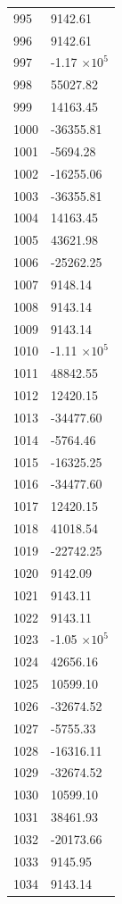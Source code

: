 \documentclass[a4paper,11pt]{article}
\begin{document}
\begin{center}
\begin{longtable}{|R{1.5cm}|R{2.6cm}|}
  995 &      9142.61 \\
  996 &      9142.61 \\
  997 &        -1.17 $\times 10^{           5}$ \\
  998 &     55027.82 \\
  999 &     14163.45 \\
 1000 &    -36355.81 \\
 1001 &     -5694.28 \\
 1002 &    -16255.06 \\
 1003 &    -36355.81 \\
 1004 &     14163.45 \\
 1005 &     43621.98 \\
 1006 &    -25262.25 \\
 1007 &      9148.14 \\
 1008 &      9143.14 \\
 1009 &      9143.14 \\
 1010 &        -1.11 $\times 10^{           5}$ \\
 1011 &     48842.55 \\
 1012 &     12420.15 \\
 1013 &    -34477.60 \\
 1014 &     -5764.46 \\
 1015 &    -16325.25 \\
 1016 &    -34477.60 \\
 1017 &     12420.15 \\
 1018 &     41018.54 \\
 1019 &    -22742.25 \\
 1020 &      9142.09 \\
 1021 &      9143.11 \\
 1022 &      9143.11 \\
 1023 &        -1.05 $\times 10^{           5}$ \\
 1024 &     42656.16 \\
 1025 &     10599.10 \\
 1026 &    -32674.52 \\
 1027 &     -5755.33 \\
 1028 &    -16316.11 \\
 1029 &    -32674.52 \\
 1030 &     10599.10 \\
 1031 &     38461.93 \\
 1032 &    -20173.66 \\
 1033 &      9145.95 \\
 1034 &      9143.14 \\

\end{longtable}
\end{center}
\end{document}
